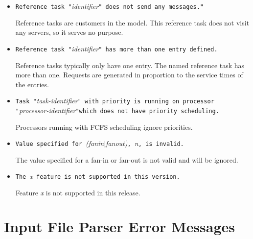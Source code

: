 \begin{itemize}
\item \texttt{Reference task "}\emph{identifier}\texttt{" does not
    send any messages." }
  
  Reference tasks are customers in the
  model.  This reference task does not visit any servers, so it serves
  no purpose.

\item \texttt{Reference task "}\emph{identifier}\texttt{" has more
    than one entry defined.}
  
  Reference tasks
  typically only have one entry.  The named reference task has more
  than one.  Requests are generated in proportion to the service times
  of the entries.

\item \texttt{Task "}\emph{task-identifier}\texttt{" with priority is
    running on processor
    "}\emph{processor-identifier}\texttt{"}\linebreak[3] \texttt{which
    does not have priority scheduling.}
  
  Processors running with FCFS scheduling
  ignore priorities.

\item \texttt{Value specified for }\emph{(fanin$|$fanout)}\texttt{,
  }\emph{n}\texttt{, is invalid.}
  
  The value specified for a fan-in or
  fan-out is not valid and will be ignored.

\item \texttt{The }\emph{x}\texttt{ feature is not supported in this version.}

  Feature \emph{x} is not supported in this release.

\end{itemize}

\section{Input File Parser Error Messages}

